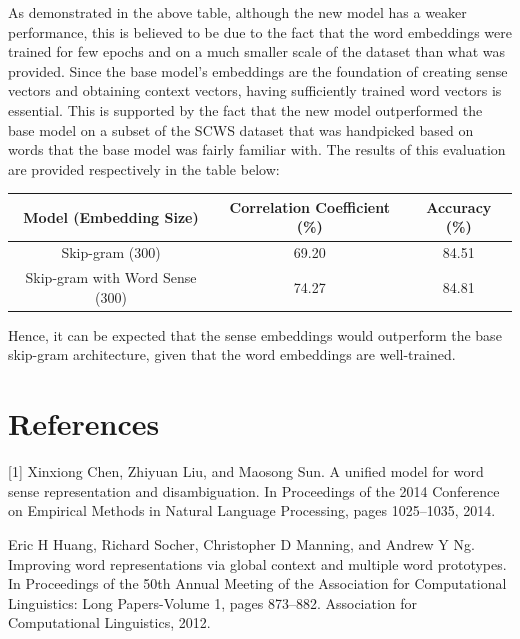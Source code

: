 \documentclass[12pt,a4paper]{article}
\begin{document}
	\vspace{-0.6cm}
	\noindent As demonstrated in the above table, although the new model has a weaker performance, this is believed to be due to the fact that the word embeddings were trained for few epochs and on a much smaller scale of the dataset than what was provided. Since the base model's embeddings are the foundation of creating sense vectors and obtaining context vectors, having sufficiently trained word vectors is essential. This is supported by the fact that the new model outperformed the base model on a subset of the SCWS dataset that was handpicked based on words that the base model was fairly familiar with. The results of this evaluation are provided respectively in the table below:
	\begin{table}[H]
		\begin{center}
			\begin{tabular}{|c|c|c|}
				\hline
				Model (Embedding Size) & Correlation Coefficient (\%) & Accuracy (\%) \\ \hline
				Skip-gram (300) &         69.20    &  84.51          \\ \hline
				Skip-gram with Word Sense (300) &  74.27    & 84.81  \\ 
				\hline             
			\end{tabular}
		\end{center}
	\end{table}
	\vspace{-0.6cm}
	\noindent Hence, it can be expected that the sense embeddings would outperform the base skip-gram architecture, given that the word embeddings are well-trained.
	
	\newpage
	
	\section{References}
	[1] Xinxiong Chen, Zhiyuan Liu, and Maosong Sun. A unified model for word
	sense representation and disambiguation. In Proceedings of the 2014 Conference on Empirical Methods in Natural Language Processing,
	pages 1025–1035, 2014.
	
	\vspace{0.2cm}
	\noindent [2] Eric H Huang, Richard Socher, Christopher D Manning, and Andrew Y Ng.
	Improving word representations via global context and multiple word prototypes. In Proceedings of the 50th Annual Meeting of the Association for
Computational Linguistics: Long Papers-Volume 1, pages 873–882. Association for Computational Linguistics, 2012.
\end{document}
